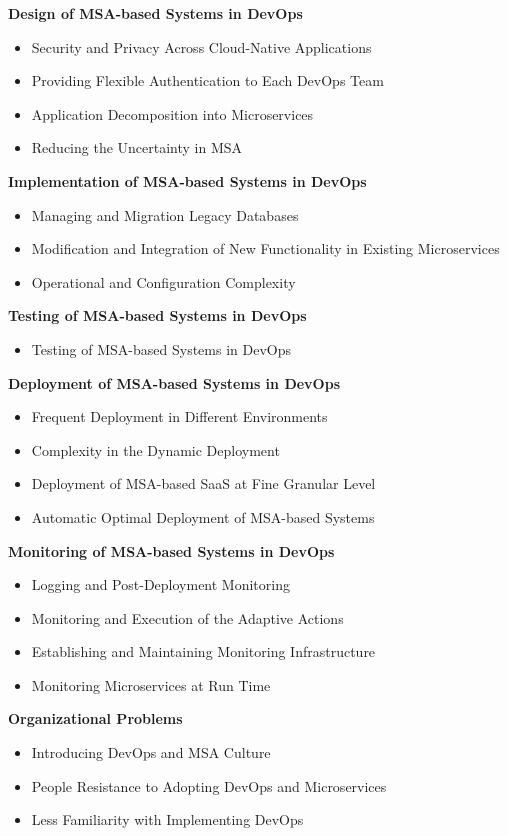 \textbf{Design of MSA-based Systems in DevOps}
\begin{itemize}
    \item Security and Privacy Across Cloud-Native Applications
    \item Providing Flexible Authentication to Each DevOps Team
    \item Application Decomposition into Microservices
    \item Reducing the Uncertainty in MSA
\end{itemize}

\textbf{Implementation of MSA-based Systems in DevOps}
\begin{itemize}
    \item Managing and Migration Legacy Databases
    \item Modification and Integration of New Functionality in Existing
          Microservices
    \item Operational and Configuration Complexity
\end{itemize}

\textbf{Testing of MSA-based Systems in DevOps}
\begin{itemize}
    \item Testing of MSA-based Systems in DevOps
\end{itemize}

\textbf{Deployment of MSA-based Systems in DevOps}
\begin{itemize}
    \item Frequent Deployment in Different Environments
    \item Complexity in the Dynamic Deployment
    \item Deployment of MSA-based SaaS at Fine Granular Level
    \item Automatic Optimal Deployment of MSA-based Systems
\end{itemize}

\textbf{Monitoring of MSA-based Systems in DevOps}
\begin{itemize}
    \item Logging and Post-Deployment Monitoring
    \item Monitoring and Execution of the Adaptive Actions
    \item Establishing and Maintaining Monitoring Infrastructure
    \item Monitoring Microservices at Run Time
\end{itemize}

\textbf{Organizational Problems}
\begin{itemize}
    \item Introducing DevOps and MSA Culture
    \item People Resistance to Adopting DevOps and Microservices
    \item Less Familiarity with Implementing DevOps
\end{itemize}

